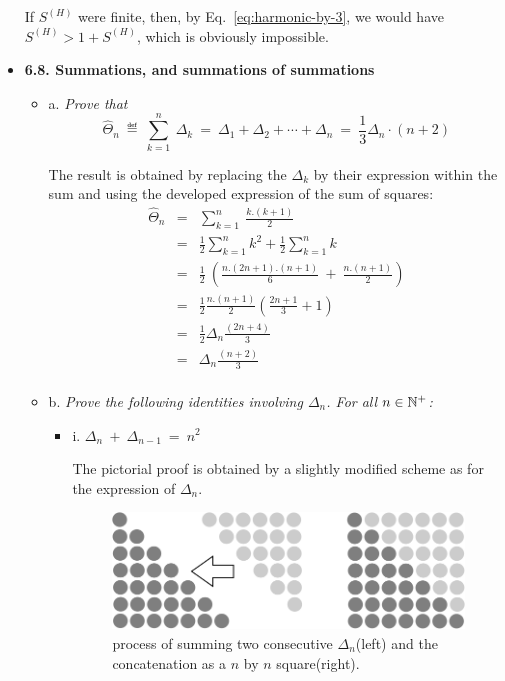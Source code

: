 \begin{itemize}
\smallskip

If $S^{(H)}$ were finite, then, by Eq.~\ref{eq:harmonic-by-3}, we would have $S^{(H)}  > 1 + S^{(H)} $, which is obviously impossible. 


\medskip
\item
{\bf 6.8. Summations, and summations of summations}
\smallskip

  \begin{itemize}
  \item a.
{\em Prove that}
\[ \widehat{\Theta}_n \ \eqdef \  \sum_{k=1}^n \ \Delta_k \ = \   
\Delta_1 + \Delta_2 + \cdots + \Delta_n \ = \ \frac{1}{3} \Delta_n \cdot (n+2) \]

The result is obtained by replacing the $\Delta_k$ by their expression within the sum
and using the developed expression of the sum of squares:
\begin{eqnarray*}
\widehat{\Theta}_n & = & \sum_{k=1}^n \ \frac{k.(k+1)}{2} \\
 & = & \frac{1}{2} \sum_{k=1}^n k^2  + \frac{1}{2} \sum_{k=1}^n k  \\
 & = & \frac{1}{2} \ \left( \frac{n.(2n+1).(n+1)}{6} \ + \ \frac{n.(n+1)}{2} \right)\\
 & = & \frac{1}{2} \frac{n.(n+1)}{2} \left( \frac{2n+1}{3} + 1 \right)  \\
 & = & \frac{1}{2} \Delta_n \frac{(2n+4)}{3}  \\
  & = & \Delta_n \frac{(n+2)}{3}  \\
\end{eqnarray*} 


  \item b.
{\em Prove the following identities involving $\Delta_n$.  For all $n \in \mathbb{N}^+$:}
    \begin{itemize}
    \item i.
$\Delta_n \ + \ \Delta_{n-1} \ = \ n^2$

\smallskip
The pictorial proof is obtained by a slightly modified scheme as for the expression of $\Delta_n$. 
\begin{figure}[htb]
\begin{center}
       \includegraphics[scale=0.35]{FiguresMaths/DeltaSumSquare}
\caption{process of summing two consecutive $\Delta_n$(left) and the concatenation as a $n$ by $n$ square(right).}
\end{center}
\end{figure}



\end{itemize}
\end{itemize}
\end{itemize}

